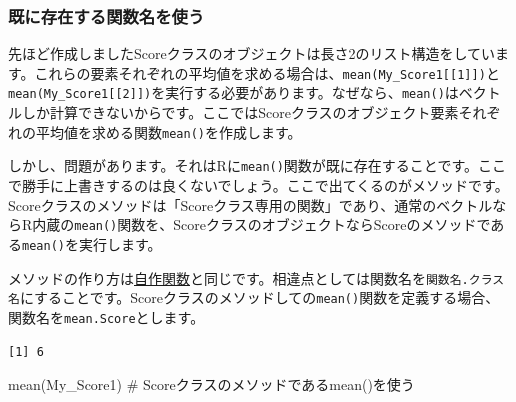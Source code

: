 \documentclass[
  a4paper,
  pandoc,
  ja=standard,
  jafont=haranoaji]{bxjsbook}
\newenvironment{Shaded}{\begin{snugshade}}{\end{snugshade}}
\newcommand{\CommentTok}[1]{\textcolor[rgb]{0.37,0.37,0.37}{#1}}
\newcommand{\ControlFlowTok}[1]{\textcolor[rgb]{0.00,0.48,0.65}{#1}}
\newcommand{\DecValTok}[1]{\textcolor[rgb]{0.68,0.00,0.00}{#1}}
\newcommand{\FunctionTok}[1]{\textcolor[rgb]{0.28,0.35,0.67}{#1}}
\newcommand{\NormalTok}[1]{\textcolor[rgb]{0.00,0.48,0.65}{#1}}
\newcommand{\OtherTok}[1]{\textcolor[rgb]{0.00,0.48,0.65}{#1}}
\newcommand{\SpecialCharTok}[1]{\textcolor[rgb]{0.37,0.37,0.37}{#1}}
\begin{document}
\hypertarget{ux65e2ux306bux5b58ux5728ux3059ux308bux95a2ux6570ux540dux3092ux4f7fux3046}{%
\subsubsection{既に存在する関数名を使う}\label{ux65e2ux306bux5b58ux5728ux3059ux308bux95a2ux6570ux540dux3092ux4f7fux3046}}

先ほど作成しましたScoreクラスのオブジェクトは長さ2のリスト構造をしています。これらの要素それぞれの平均値を求める場合は、\texttt{mean(My\_Score1{[}{[}1{]}{]})}と\texttt{mean(My\_Score1{[}{[}2{]}{]})}を実行する必要があります。なぜなら、\texttt{mean()}はベクトルしか計算できないからです。ここではScoreクラスのオブジェクト要素それぞれの平均値を求める関数\texttt{mean()}を作成します。

しかし、問題があります。それはRに\texttt{mean()}関数が既に存在することです。ここで勝手に上書きするのは良くないでしょう。ここで出てくるのがメソッドです。Scoreクラスのメソッドは「Scoreクラス専用の関数」であり、通常のベクトルならR内蔵の\texttt{mean()}関数を、ScoreクラスのオブジェクトならScoreのメソッドである\texttt{mean()}を実行します。

メソッドの作り方は\href{https://www.jaysong.net/RBook/functions.html}{自作関数}と同じです。相違点としては関数名を\texttt{関数名.クラス名}にすることです。Scoreクラスのメソッドしての\texttt{mean()}関数を定義する場合、関数名を\texttt{mean.Score}とします。

\begin{Shaded}
\end{Shaded}

\begin{verbatim}
[1] 6
\end{verbatim}

\begin{Shaded}
\begin{Highlighting}[numbers=left,,]
\FunctionTok{mean}\NormalTok{(My\_Score1) }\CommentTok{\# Scoreクラスのメソッドであるmean()を使う}
\end{Highlighting}
\end{Shaded}
\end{document}
